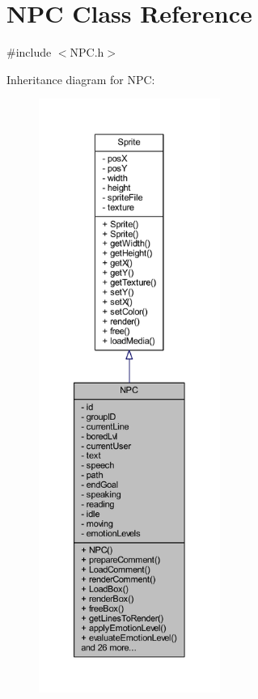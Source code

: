 \hypertarget{class_n_p_c}{}\section{N\+PC Class Reference}
\label{class_n_p_c}


{\ttfamily \#include $<$N\+P\+C.\+h$>$}



Inheritance diagram for N\+PC\+:\nopagebreak
\begin{figure}[H]
\begin{center}
\leavevmode
\includegraphics[height=550pt]{class_n_p_c__inherit__graph}
\end{center}
\end{figure}


